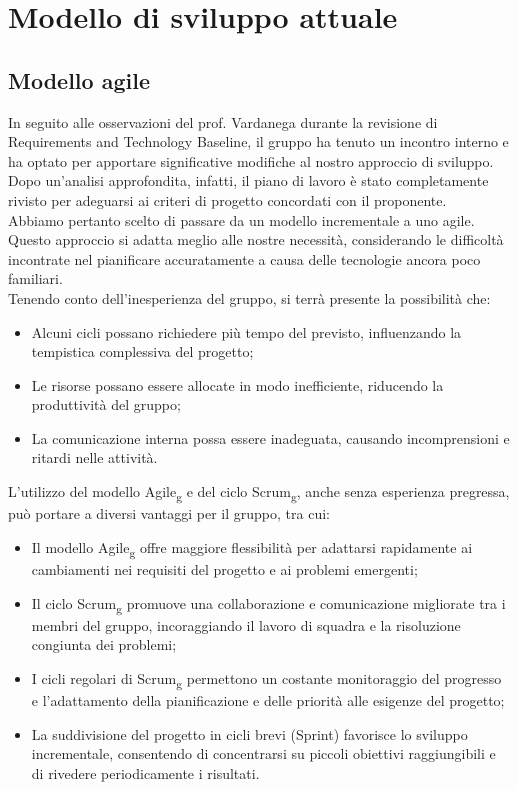 \section{Modello di sviluppo attuale}
\subsection{Modello agile}
In seguito alle osservazioni del prof. Vardanega durante la revisione di Requirements and Technology Baseline, il gruppo ha tenuto un incontro interno e ha optato per apportare significative modifiche al nostro approccio di sviluppo. Dopo un'analisi approfondita, infatti, il piano di lavoro è stato completamente rivisto per adeguarsi ai criteri di progetto concordati con il proponente. \\
Abbiamo pertanto scelto di passare da un modello incrementale a uno agile. Questo approccio si adatta meglio alle nostre necessità, considerando le difficoltà incontrate nel pianificare accuratamente a causa delle tecnologie ancora poco familiari.\\

Tenendo conto dell'inesperienza del gruppo, si terrà presente la possibilità che:
\begin{itemize}
\item Alcuni cicli possano richiedere più tempo del previsto, influenzando la tempistica complessiva del progetto;
\item Le risorse possano essere allocate in modo inefficiente, riducendo la produttività del gruppo;
\item La comunicazione interna possa essere inadeguata, causando incomprensioni e ritardi nelle attività.
\end{itemize}

L'utilizzo del modello Agile\textsubscript{g} e del ciclo Scrum\textsubscript{g}, anche senza esperienza pregressa, può portare a diversi vantaggi per il gruppo, tra cui:
\begin{itemize}
\item Il modello Agile\textsubscript{g} offre maggiore flessibilità per adattarsi rapidamente ai cambiamenti nei requisiti del progetto e ai problemi emergenti;
\item Il ciclo Scrum\textsubscript{g} promuove una collaborazione e comunicazione migliorate tra i membri del gruppo, incoraggiando il lavoro di squadra e la risoluzione congiunta dei problemi;
\item I cicli regolari di Scrum\textsubscript{g} permettono un costante monitoraggio del progresso e l'adattamento della pianificazione e delle priorità alle esigenze del progetto;
\item La suddivisione del progetto in cicli brevi (Sprint) favorisce lo sviluppo incrementale, consentendo di concentrarsi su piccoli obiettivi raggiungibili e di rivedere periodicamente i risultati.
\end{itemize}

